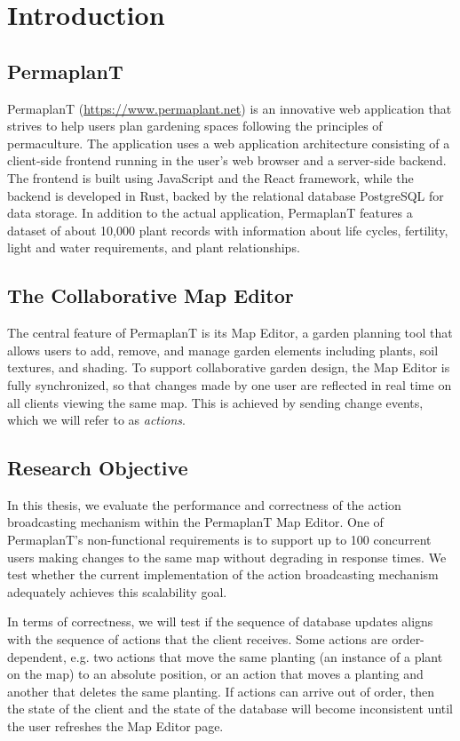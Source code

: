 \documentclass[final,oneside]{vutinfth}
\begin{document}
\chapter{Introduction}

\section{PermaplanT}

PermaplanT (\url{https://www.permaplant.net}) is an innovative web application that strives to help users plan gardening spaces following the principles of permaculture.
The application uses a web application architecture consisting of a client-side frontend running in the user's web browser and a server-side backend.
The frontend is built using JavaScript and the React framework, while the backend is developed in Rust, backed by the relational database PostgreSQL for data storage.
In addition to the actual application, PermaplanT features a dataset of about 10,000 plant records with information about life cycles, fertility, light and water requirements, and plant relationships.

\section{The Collaborative Map Editor}

The central feature of PermaplanT is its Map Editor, a garden planning tool that allows users to add, remove, and manage garden elements including plants, soil textures, and shading.
To support collaborative garden design, the Map Editor is fully synchronized, so that changes made by one user are reflected in real time on all clients viewing the same map. This is achieved by sending change events, which we will refer to as \emph{actions}.

\section{Research Objective}

In this thesis, we evaluate the performance and correctness of the action broadcasting mechanism within the PermaplanT Map Editor.
One of PermaplanT's non-functional requirements is to support up to 100 concurrent users making changes to the same map without degrading in response times.
We test whether the current implementation of the action broadcasting mechanism adequately achieves this scalability goal.

In terms of correctness, we will test if the sequence of database updates aligns with the sequence of actions that the client receives.
Some actions are order-dependent, e.g. two actions that move the same planting (an instance of a plant on the map) to an absolute position, or an action that moves a planting and another that deletes the same planting.
If actions can arrive out of order, then the state of the client and the state of the database will become inconsistent until the user refreshes the Map Editor page.
\end{document}
